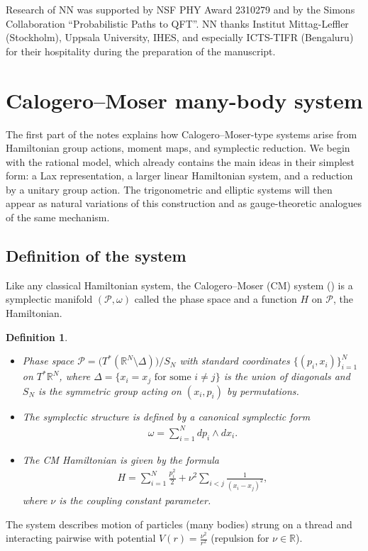 \documentclass[12pt]{article}
\newtheorem{defn}{Definition}[section]
\numberwithin{equation}{section}
\theoremstyle{definition}
\begin{document}
Research of NN was supported by NSF PHY Award 2310279 and by the Simons Collaboration ``Probabilistic Paths to QFT''. 
NN thanks Institut Mittag-Leffler (Stockholm), Uppsala University, IHES, and especially ICTS-TIFR (Bengaluru) for their hospitality during the preparation of the manuscript.  


\section{Calogero--Moser many-body system}
The first part of the notes explains how Calogero--Moser-type systems arise from Hamiltonian group actions, moment maps, and symplectic reduction. We begin with the rational model, which already contains the main ideas in their simplest form: a Lax representation, a larger linear Hamiltonian system, and a reduction by a unitary group action. The trigonometric and elliptic systems will then appear as natural variations of this construction and as gauge-theoretic analogues of the same mechanism.
\subsection{Definition of the system}
Like any classical Hamiltonian system, the Calogero--Moser (CM) system (\cite{Calogero1971}) is a symplectic manifold $(\mathcal{P}, {\omega})$  called {\sf the phase space} and a function $H$ on $\mathcal{P}$, {\sf the Hamiltonian}.

\begin{defn}
\normalfont
\begin{itemize}[label=\raisebox{0.25ex}{\tiny$\bullet$}]
(Rational) Calogero--Moser system is the triple
\item
    Phase space $\mathcal{P} = \big( T^{*}(\mathbb{R}^{N} \setminus \Delta ) \big) / S_{N}$
   with standard coordinates $\{(p_i, x_i)\}_{i = 1}^{N}$ on $T^{*}\mathbb{R}^{N}$, where $\Delta = \{x_i = x_j \text{ for some } i \neq j\}$ is the  union of diagonals and $S_{N}$ is the symmetric group acting on $(x_i, p_i)$ by permutations.
 \item
   The symplectic structure is defined by a canonical symplectic form
   \begin{align*}
       \omega = \sum \limits_{i = 1}^{N} d p_i \wedge dx_{i}.
   \end{align*}
   \item
  
    The CM Hamiltonian is given by the formula
    \begin{align*}
        H = \sum\limits_{i = 1}^{N} \frac{p_i^2}{2} + \nu^2 \sum\limits_{i < j} \frac{1}{(x_i - x_j)^2},
    \end{align*}
    where $\nu$ is the \textit{coupling constant} parameter.
\end{itemize}
\end{defn}
    The system describes motion of particles (many bodies) strung on a thread and interacting pairwise with potential $V(r) = \frac{\nu^2}{r^2}$ (repulsion for $\nu \in \mathbb{R}$).
\end{document}
